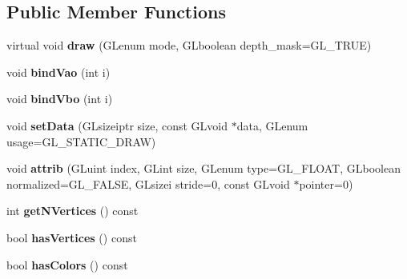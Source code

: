 \subsection*{Public Member Functions}
\begin{DoxyCompactItemize}
\item 
\hypertarget{classant_drawable_a911b72e36adfdab82b5800c3da08f53d}{virtual void {\bfseries draw} (G\+Lenum mode, G\+Lboolean depth\+\_\+mask=G\+L\+\_\+\+T\+R\+U\+E)}\label{classant_drawable_a911b72e36adfdab82b5800c3da08f53d}

\item 
\hypertarget{classant_drawable_adb22318201dc679c672f3fa5b652a132}{void {\bfseries bind\+Vao} (int i)}\label{classant_drawable_adb22318201dc679c672f3fa5b652a132}

\item 
\hypertarget{classant_drawable_a5c7ff9f9339a47eda75cdfb93ee7813c}{void {\bfseries bind\+Vbo} (int i)}\label{classant_drawable_a5c7ff9f9339a47eda75cdfb93ee7813c}

\item 
\hypertarget{classant_drawable_a34c687f540d7577a16c84a57f2e2342b}{void {\bfseries set\+Data} (G\+Lsizeiptr size, const G\+Lvoid $\ast$data, G\+Lenum usage=G\+L\+\_\+\+S\+T\+A\+T\+I\+C\+\_\+\+D\+R\+A\+W)}\label{classant_drawable_a34c687f540d7577a16c84a57f2e2342b}

\item 
\hypertarget{classant_drawable_a0e41419e96b0f3d7832ea6d9dc568ee0}{void {\bfseries attrib} (G\+Luint index, G\+Lint size, G\+Lenum type=G\+L\+\_\+\+F\+L\+O\+A\+T, G\+Lboolean normalized=G\+L\+\_\+\+F\+A\+L\+S\+E, G\+Lsizei stride=0, const G\+Lvoid $\ast$pointer=0)}\label{classant_drawable_a0e41419e96b0f3d7832ea6d9dc568ee0}

\item 
\hypertarget{classant_drawable_a3de5a89016b2f1614153b31cd4ff8dd7}{int {\bfseries get\+N\+Vertices} () const }\label{classant_drawable_a3de5a89016b2f1614153b31cd4ff8dd7}

\item 
\hypertarget{classant_drawable_a13576b9816d01ed137c2ed246bd7edaa}{bool {\bfseries has\+Vertices} () const }\label{classant_drawable_a13576b9816d01ed137c2ed246bd7edaa}

\item 
\hypertarget{classant_drawable_ac30d77a790bed03e46e5f56365261860}{bool {\bfseries has\+Colors} () const }\label{classant_drawable_ac30d77a790bed03e46e5f56365261860}


\end{DoxyCompactItemize}
